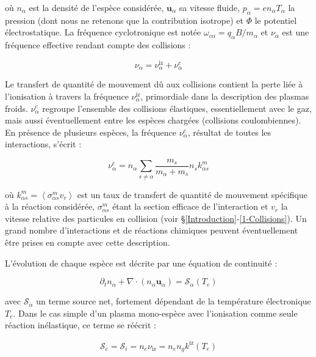 \begin{refsection}
où $n_\alpha$ est la densité de l'espèce considérée, $\mathbf{u}_\alpha$ sa
vitesse fluide, $p_\alpha =en_\alpha T_\alpha$ la pression (dont nous ne
retenons que la contribution isotrope) et $\Phi$ le potentiel électrostatique. La fréquence
cyclotronique est notée $\omega_{c\alpha}=q_\alpha B/m_\alpha$ et $\nu_\alpha$
est une fréquence effective rendant compte des collisions :

\begin{equation}
\nu_\alpha=\nu_{\alpha}^\text{iz}+\nu_{\alpha}^{c}
\end{equation}

Le transfert de quantité de mouvement dû aux collisions contient la perte liée à
l'ionisation à travers la fréquence $\nu_{\alpha}^\text{iz}$, primordiale dans
la description des plasmas froids. $\nu_{\alpha}^{c}$ regroupe l'ensemble des
collisions élastiques, essentiellement avec le gaz, mais aussi éventuellement
entre les espèces chargées (collisions coulombiennes). En présence de plusieurs espèces, la
fréquence $\nu_{\alpha}^{c}$, résultat de toutes les interactions, s'écrit :

\begin{equation}
\nu_{\alpha}^c=n_\alpha\sum_{s\neq\alpha} \frac{m_s}{m_\alpha+m_s}
n_sk^m_{\alpha s}
\end{equation}

où $k^m_{\alpha
s}=\left<\sigma^m_{\alpha s}v_r\right>$ est un taux de transfert de quantité de
mouvement spécifique à la réaction considérée, $\sigma^m_{\alpha s}$ étant la
section efficace de l'interaction et $v_r$ la vitesse relative des particules en
collision (voir \S\ref{Introduction}-\ref{1-Collisions}). Un grand nombre
d'interactions et de réactions chimiques peuvent éventuellement être prises en compte avec cette description.

L'évolution de chaque espèce est décrite par une équation de continuité :

\begin{equation}
\label{3-continuite}
\partial_t n_\alpha +
\nabla\cdot\left(n_\alpha\mathbf{u}_\alpha\right)=\mathcal{S}_\alpha(T_e)
\end{equation}

avec $\mathcal{S}_\alpha$ un terme source net, fortement dépendant de la
température électronique $T_e$. Dans le cas simple d'un plasma mono-espèce avec
l'ionisation comme seule réaction inélastique, ce terme se réécrit :

\begin{equation}
\mathcal S_e=\mathcal
S_i=n_e\nu_\text{iz}=n_en_gk^\text{iz}(T_e) 
\end{equation}


\end{refsection}
